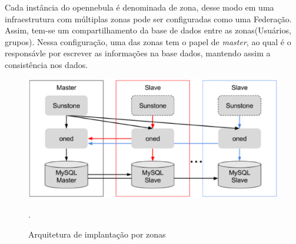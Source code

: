 Cada instância do opennebula é denominada de zona, desse modo em uma infraestrutura com múltiplas zonas pode ser configuradas como uma Federação. Assim, tem-se um compartilhamento da base de dados entre as zonas(Usuários, grupos). Nessa configuração, uma das zonas tem o papel de \textit{master}, ao qual é o responsávle por escrever as informações na base dados, mantendo assim a consistência nos dados\cite{opennebula}.

\begin{figure}[!htb]
\centering
\includegraphics [keepaspectratio=true,scale=0.60]{figuras/opennebula_zone.eps}
\caption{Arquitetura de implantação por zonas}
\cite{opennebula}.
\label{opennebulafederation}
\end{figure}

